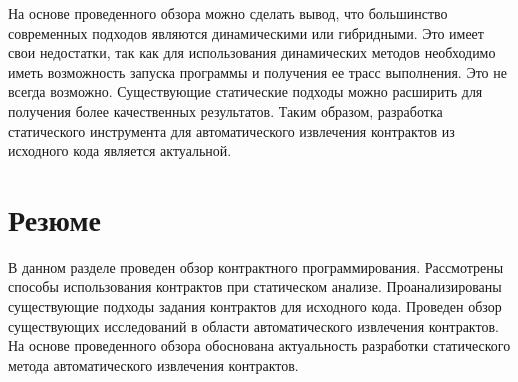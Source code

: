 На основе проведенного обзора можно сделать вывод, что большинство современных подходов являются динамическими или гибридными. Это имеет свои недостатки, так как для использования динамических методов необходимо иметь возможность запуска программы и получения ее трасс выполнения. Это не всегда возможно. Существующие статические подходы можно расширить для получения более качественных результатов. Таким образом, разработка статического инструмента для автоматического извлечения контрактов из исходного кода является актуальной.

\section{Резюме}
В данном разделе проведен обзор контрактного программирования. Рассмотрены способы использования контрактов при статическом анализе. Проанализированы существующие подходы задания контрактов для исходного кода. Проведен обзор существующих исследований в области автоматического извлечения контрактов. На основе проведенного обзора обоснована актуальность разработки статического метода автоматического извлечения контрактов.
